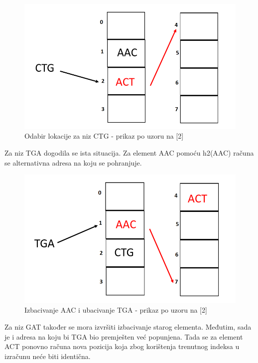 \documentclass[times, utf8, seminar, numeric]{fer}
\begin{document}
\begin{figure}[H]
  \centering
  \setlength{\intextsep}{5pt}
  \includegraphics[scale = 0.4]{images/insertion3.png}
  \caption{Odabir lokacije za niz CTG - prikaz po uzoru na [2]}
  \label{fig_insert3}
\end{figure}

Za niz TGA dogodila se  ista situacija. Za element AAC pomoću h2(AAC) računa se alternativna adresa na koju se pohranjuje.

\begin{figure}[H]
  \centering
  \setlength{\intextsep}{5pt}
  \includegraphics[scale = 0.4]{images/swap1.png}
  \caption{Izbacivanje AAC i ubacivanje TGA - prikaz po uzoru na [2]}
  \label{fig_swap1}
\end{figure}

Za niz GAT također se mora izvršiti izbacivanje starog elementa. Međutim, sada je i adresa na koju bi TGA bio premješten već popunjena. Tada se za element ACT ponovno računa nova pozicija koja zbog korištenja trenutnog indeksa u izračunu neće biti identična. 
\end{document}
